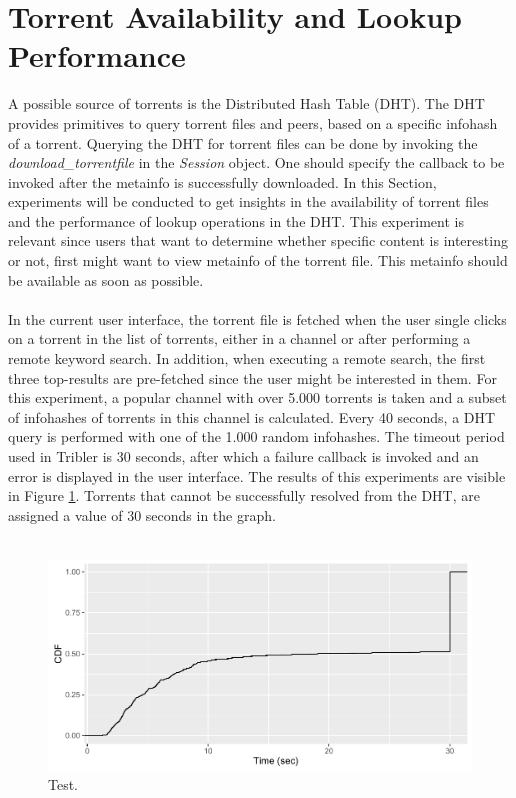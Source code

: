 \section{Torrent Availability and Lookup Performance}
A possible source of torrents is the Distributed Hash Table (DHT). The DHT provides primitives to query torrent files and peers, based on a specific infohash of a torrent. Querying the DHT for torrent files can be done by invoking the \emph{download\_torrentfile} in the \emph{Session} object. One should specify the callback to be invoked after the metainfo is successfully downloaded. In this Section, experiments will be conducted to get insights in the availability of torrent files and the performance of lookup operations in the DHT. This experiment is relevant since users that want to determine whether specific content is interesting or not, first might want to view metainfo of the torrent file. This metainfo should be available as soon as possible.\\\\
In the current user interface, the torrent file is fetched when the user single clicks on a torrent in the list of torrents, either in a channel or after performing a remote keyword search. In addition, when executing a remote search, the first three top-results are pre-fetched since the user might be interested in them. For this experiment, a popular channel with over 5.000 torrents is taken and a subset of infohashes of torrents in this channel is calculated. Every 40 seconds, a DHT query is performed with one of the 1.000 random infohashes. The timeout period used in Tribler is 30 seconds, after which a failure callback is invoked and an error is displayed in the user interface. The results of this experiments are visible in Figure \ref{fig:metainfo_fetch}. Torrents that cannot be successfully resolved from the DHT, are assigned a value of 30 seconds in the graph.\\\\

\begin{figure}[!h]
	\centering
	\includegraphics[width=0.9\columnwidth]{images/experiments/metainfo_fetch}
	\caption{Test.}
	\label{fig:metainfo_fetch}
\end{figure}

